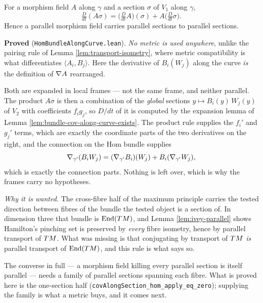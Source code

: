 \begin{lemma}
  \label{lem:hom-bundle-along-curve}
  \leanok
  For a morphism field $A$ along $\gamma$ and a section $\sigma$ of $V_1$ along
  $\gamma$,
  \[
    \tfrac{D}{dt}(A\sigma)
      = \Big(\tfrac{D}{dt}A\Big)(\sigma) + A\Big(\tfrac{D}{dt}\sigma\Big).
  \]
  Hence a parallel morphism field carries parallel sections to parallel
  sections.

  \textbf{Proved} (\texttt{HomBundleAlongCurve.lean}). \emph{No metric is used
  anywhere}, unlike the pairing rule of Lemma \ref{lem:transport-isometry},
  where metric compatibility is what differentiates $\langle A_i, B_j\rangle$.
  Here the derivative of $B_i(W_j)$ along the curve \emph{is} the definition of
  $\nabla A$ rearranged.

  Both are expanded in local frames --- not the same frame, and neither
  parallel. The product $A\sigma$ is then a combination of the \emph{global}
  sections $y \mapsto B_i(y)\,W_j(y)$ of $V_2$ with coefficients $f_i g_j$, so
  $D/dt$ of it is computed by the expansion lemma of
  Lemma \ref{lem:bundle-cov-along-curve-exists}. The product rule supplies the
  $f_i'$ and $g_j'$ terms, which are exactly the coordinate parts of the two
  derivatives on the right, and the connection on the Hom bundle supplies
  \[
    \nabla_{\gamma'}(B_i W_j)
      = (\nabla_{\gamma'}B_i)(W_j) + B_i(\nabla_{\gamma'}W_j),
  \]
  which is exactly the connection parts. Nothing is left over, which is why the
  frames carry no hypotheses.

  \emph{Why it is wanted.} The cross-fibre half of the maximum principle
  carries the tested direction between fibres of the bundle the tested object
  is a section of. In dimension three that bundle is $\operatorname{End}(TM)$, and
  Lemma \ref{lem:ivey-parallel} shows Hamilton's pinching set is preserved by
  \emph{every} fibre isometry, hence by parallel transport of $TM$. What was
  missing is that conjugating by transport of $TM$ \emph{is} parallel
  transport of $\operatorname{End}(TM)$, and this rule is what says so.

  The converse in full --- a morphism field killing every parallel section is
  itself parallel --- needs a family of parallel sections spanning each fibre.
  What is proved here is the one-section half
  (\texttt{covAlongSection\_hom\_apply\_eq\_zero}); supplying the family is
  what a metric buys, and it comes next.
\end{lemma}

